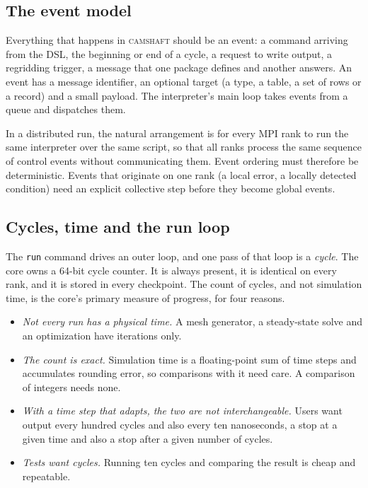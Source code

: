 \documentclass[11pt,a4paper]{article}
\newcommand{\camshaft}{\textsc{camshaft}}
\newcommand{\code}[1]{\texttt{#1}}
\begin{document}
\subsection{The event model}

Everything that happens in \camshaft{} should be an event: a command arriving
from the DSL, the beginning or end of a cycle, a request to write output,
a regridding trigger, a message that one package defines and another answers.
An event has a message identifier, an optional target (a type, a table, a
set of rows or a record) and a small payload.  The interpreter's main loop takes events
from a queue and dispatches them.

In a distributed run, the natural arrangement is for every MPI rank to run
the same interpreter over the same script, so that all ranks process the same
sequence of control events without communicating them.  Event ordering must
therefore be deterministic.  Events that originate on one rank (a local error,
a locally detected condition) need an explicit collective step before they
become global events.

\subsection{Cycles, time and the run loop}
\label{sec:cycles}

The \code{run} command drives an outer loop, and one pass of that loop is a
\emph{cycle}.  The core owns a 64-bit cycle counter.  It is always present,
it is identical on every rank, and it is stored in every checkpoint.  The
count of cycles, and not simulation time, is the core's primary measure of
progress, for four reasons.

\begin{itemize}
  \item \emph{Not every run has a physical time.}  A mesh generator, a
        steady-state solve and an optimization have iterations only.
  \item \emph{The count is exact.}  Simulation time is a floating-point sum
        of time steps and accumulates rounding error, so comparisons with it
        need care.  A comparison of integers needs none.
  \item \emph{With a time step that adapts, the two are not
        interchangeable.}  Users want output every hundred cycles and also
        every ten nanoseconds, a stop at a given time and also a stop after
        a given number of cycles.
  \item \emph{Tests want cycles.}  Running ten cycles and comparing the
        result is cheap and repeatable.
\end{itemize}
\end{document}
